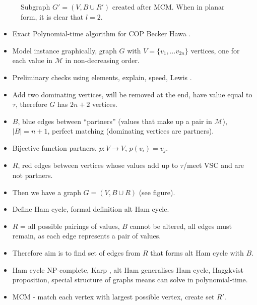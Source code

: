 \documentclass{elsarticle}
\begin{document}
\begin{figure}[H]	
	\centering
	\begin{subfigure}[h]{0.4\textwidth}
		
	\end{subfigure} \quad
	\begin{subfigure}[h]{0.4\textwidth}
		
	\end{subfigure}
	\caption{Subgraph $G'= (V, B \cup R')$ created after MCM. When in planar form, it is clear that $l = 2$.}
	\label{fig:mps}
\end{figure}

\begin{itemize}
	\item Exact Polynomial-time algorithm for COP Becker \cite{becker2015} Hawa \cite{hawa2018}.
	\item Model instance graphically, graph $G$ with $V = \{v_1, ...v_{2n}\}$ vertices, one for each value in $\mathcal{M}$ in non-decreasing order.
	\item Preliminary checks using elements, explain, speed, Lewis \cite{lewis2011}.
	\item Add two dominating vertices, will be removed at the end, have value equal to $\tau$, therefore $G$ has $2n+2$ vertices.
	\item $B$, blue edges between ``partners'' (values that make up a pair in $\mathcal{M}$), $|B| = n+1$, perfect matching (dominating vertices are partners).
	\item Bijective function partners, $p : V \to V$, $p(v_i) = v_j$.
	\item $R$, red edges between vertices whose values add up to $\tau$/meet VSC and are not partners.
	\item Then we have a graph $G = (V, B \cup R)$ (see figure).
	\item Define Ham cycle, formal definition alt Ham cycle.
	\item $R$ = all possible pairings of values, $B$ cannot be altered, all edges must remain, as each edge represents a pair of values.
	\item Therefore aim is to find set of edges from $R$ that forms alt Ham cycle with $B$.
	\item Ham cycle NP-complete, Karp \cite{karp1972}, alt Ham generalises Ham cycle, Haggkvist \cite{haggkvist1977} proposition, special structure of graphs means can solve in polynomial-time.
	\item MCM - match each vertex with largest possible vertex, create set $R'$.

\end{itemize}
\end{document}
